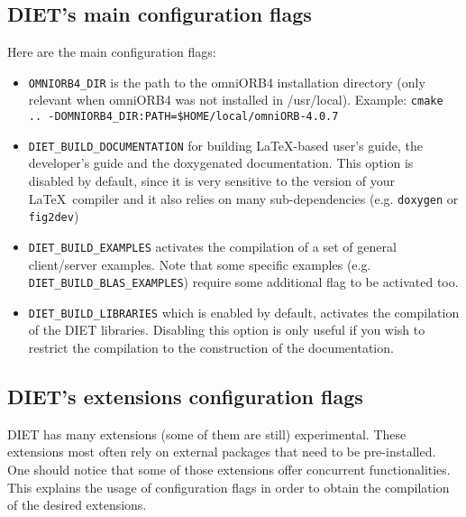 \subsection{DIET's main configuration flags}

Here are the main configuration flags:
\begin{itemize}
\item
  \verb+OMNIORB4_DIR+ is the path to the omniORB4 installation directory
  (only relevant when omniORB4 was not installed in /usr/local).
  Example: \verb+cmake .. -DOMNIORB4_DIR:PATH=$HOME/local/omniORB-4.0.7+

\item
  \verb+DIET_BUILD_DOCUMENTATION+ for building LaTeX-based user's guide,
  the developer's guide and the doxygenated documentation.
  This option is disabled by default, since it is very sensitive to the
  version of your \LaTeX\ compiler and it also relies on many sub-dependencies
  (e.g. \verb+doxygen+ or \verb+fig2dev+)

\item
  \verb+DIET_BUILD_EXAMPLES+ activates the compilation of a set of
  general client/server examples. Note that some specific examples
  (e.g. \verb+DIET_BUILD_BLAS_EXAMPLES+) require some additional flag
  to be activated too.

\item
  \verb+DIET_BUILD_LIBRARIES+ which is enabled by default, activates the
  compilation of the DIET libraries.
  Disabling this option is only useful if you wish to restrict the
  compilation to the construction of the documentation.
\end{itemize}

\subsection{DIET's extensions configuration flags}

DIET has many extensions (some of them are still) experimental. These
extensions most often rely on external packages that need to be pre-installed.
One should notice that some of those extensions offer concurrent
functionalities.
This explains the usage of configuration flags in order to obtain
the compilation of the desired extensions.

